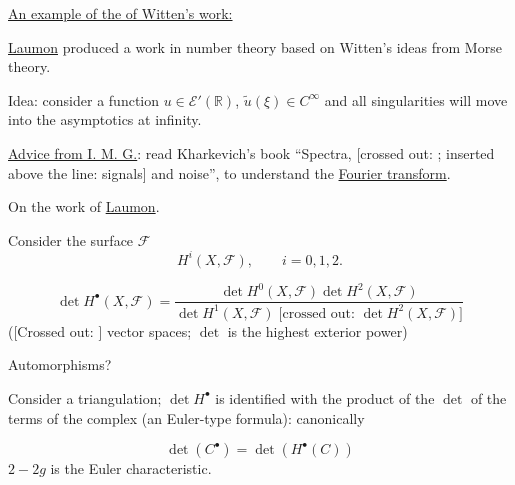 \medskip
\underline{An example of the  of Witten's work:}

\underline{Laumon} produced a work in number theory based on Witten's ideas
from Morse theory.

Idea: consider a function $u\in\mathcal E'(\mathbb R)$,
$\widetilde u(\xi)\in C^\infty$
and all singularities will move into the asymptotics at infinity.

\underline{Advice from I. M. G.}: read Kharkevich's book
“Spectra, [crossed out:
;
inserted above the line: signals] and noise”,
to understand the \underline{Fourier transform}.

On the work of \underline{Laumon}.

\begin{center}
\end{center}

Consider the surface $\mathcal F$
\begin{equation*}
 H^i(X,\mathcal F),\qquad i=0,1,2.
\end{equation*}

\begin{equation}
 \det H^\bullet(X,\mathcal F)=
 \frac{\det H^0(X,\mathcal F)\det H^2(X,\mathcal F)}
 {\det H^1(X,\mathcal F)\;
 \text{[crossed out: }\det H^2(X,\mathcal F)\text{]}}
 \tag{1}
\end{equation}
([Crossed out:
]
vector spaces;
$\det$ is the highest exterior power)

Automorphisms?

Consider a triangulation; $\det H^\bullet$ is identified with the product of the $\det$
of the terms of the complex (an Euler-type formula): canonically


\begin{equation*}
\det(C^\bullet)=\det(H^\bullet(C)) \tag{2}
\end{equation*}
$2-2g$ is the Euler characteristic.

